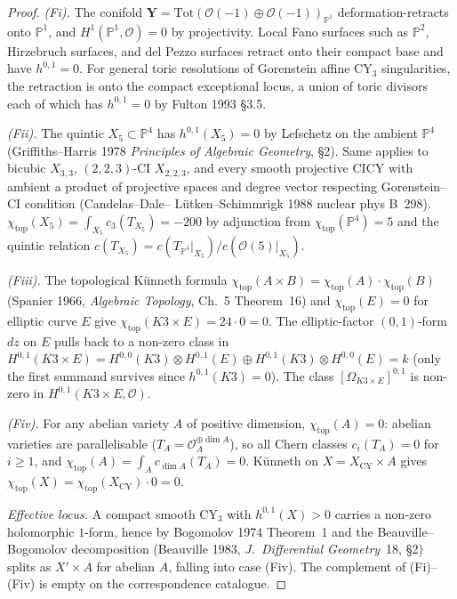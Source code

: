 \begin{proof}
\emph{(Fi).} The conifold $\mathbf Y = \mathrm{Tot}(\mathcal O(-1)
\oplus \mathcal O(-1))_{\mathbb P^1}$ deformation-retracts onto
$\mathbb P^1$, and $H^1(\mathbb P^1, \mathcal O) = 0$ by projectivity.
Local Fano surfaces such as $\mathbb P^2$, Hirzebruch surfaces, and del Pezzo
surfaces retract onto their compact base and have $h^{0,1}=0$. For general toric
resolutions of Gorenstein affine CY$_3$ singularities, the retraction
is onto the compact exceptional locus, a union of toric divisors each
of which has $h^{0,1} = 0$ by Fulton 1993 \S 3.5.

\emph{(Fii).} The quintic $X_5 \subset \mathbb P^4$ has
$h^{0,1}(X_5) = 0$ by Lefschetz on the ambient $\mathbb P^4$
(Griffiths--Harris 1978 \emph{Principles of Algebraic Geometry}, \S 2).
Same applies to bicubic $X_{3,3}$, $(2,2,3)$-CI $X_{2,2,3}$, and every
smooth projective CICY with ambient a product of projective spaces and
degree vector respecting Gorenstein--CI condition (Candelas--Dale--%
Lütken--Schimmrigk 1988 nuclear phys B~298). $\chi_{\mathrm{top}}(X_5) =
\int_{X_5} c_3(T_{X_5}) = -200$ by adjunction from
$\chi_{\mathrm{top}}(\mathbb P^4) = 5$ and the quintic relation
$c(T_{X_5}) = c(T_{\mathbb P^4}|_{X_5})/c(\mathcal O(5)|_{X_5})$.

\emph{(Fiii).} The topological K\"unneth formula
$\chi_{\mathrm{top}}(A \times B) = \chi_{\mathrm{top}}(A) \cdot
\chi_{\mathrm{top}}(B)$ (Spanier 1966, \emph{Algebraic Topology}, Ch.~5
Theorem~16) and $\chi_{\mathrm{top}}(E) = 0$ for elliptic curve $E$
give $\chi_{\mathrm{top}}(K3 \times E) = 24 \cdot 0 = 0$. The
elliptic-factor $(0,1)$-form $dz$ on $E$ pulls back to a non-zero class
in $H^{0,1}(K3 \times E) = H^{0,0}(K3) \otimes H^{0,1}(E) \oplus
H^{0,1}(K3) \otimes H^{0,0}(E) = k$ (only the first summand survives
since $h^{0,1}(K3) = 0$). The class $[\Omega_{K3 \times E}]^{0,1}$ is
non-zero in $H^{0,1}(K3 \times E, \mathcal O)$.

\emph{(Fiv).} For any abelian variety $A$ of positive dimension,
$\chi_{\mathrm{top}}(A) = 0$: abelian varieties are parallelisable
($T_A = \mathcal O_A^{\oplus \dim A}$), so all Chern classes
$c_i(T_A) = 0$ for $i \geq 1$, and $\chi_{\mathrm{top}}(A) =
\int_A c_{\dim A}(T_A) = 0$. K\"unneth on $X = X_{\mathrm{CY}} \times A$
gives $\chi_{\mathrm{top}}(X) = \chi_{\mathrm{top}}(X_{\mathrm{CY}})
\cdot 0 = 0$.

\emph{Effective locus.} A compact smooth CY$_3$ with $h^{0,1}(X) > 0$
carries a non-zero holomorphic $1$-form, hence by Bogomolov 1974
Theorem~1 and the Beauville--Bogomolov decomposition (Beauville 1983,
\emph{J.\ Differential Geometry}~18, \S 2) splits as $X' \times A$ for
abelian $A$, falling into case (Fiv). The complement of (Fi)--(Fiv)
is empty on the correspondence catalogue.
\end{proof}

